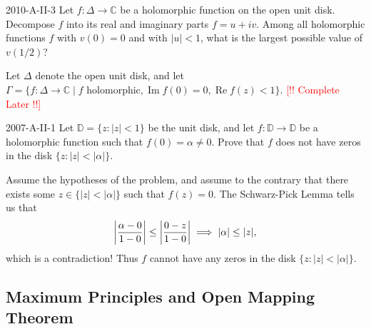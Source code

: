 \documentclass{article}
\newcommand{\complete}{\textcolor{red}{[!! Complete Later !!]}}
\begin{document}
	\begin{prb}{2010-A-II-3}
		Let $f: \Delta \to \mathbb{C}$ be a holomorphic function on the open unit disk. Decompose $f$ into its real and imaginary parts $f = u + iv$. Among all holomorphic functions $f$ with $v(0) = 0$ and with $|u| < 1$, what is the largest possible value of $v(1/2)$? 
	\end{prb}
	Let $\Delta$ denote the open unit disk, and let $\Gamma = \{f: \Delta \to \mathbb{C} \mid f \text{ holomorphic}, \operatorname{Im}{f(0)} = 0, \operatorname{Re}{f(z)} < 1\}$.  \complete 
	
	\begin{prb}{2007-A-II-1}
		Let $\mathbb{D} = \{z: |z| < 1\}$ be the unit disk, and let $f: \mathbb{D} \to \mathbb{D}$ be a holomorphic function such that $f(0) = \alpha \neq 0$. Prove that $f$ does not have zeros in the disk $\{z: |z| < |\alpha|\}$. 
	\end{prb}
	Assume the hypotheses of the problem, and assume to the contrary that there exists some $z \in \{|z| < |\alpha|\}$ such that $f(z) = 0$. The Schwarz-Pick Lemma tells us that 
	\begin{equation*}
		\left| \frac{\alpha - 0}{1 -0} \right| \leq \left| \frac{0 - z}{1 - 0} \right| \implies |\alpha|\leq |z|, 
	\end{equation*}
	which is a contradiction! Thus $f$ cannot have any zeros in the disk $\{z: |z| < |\alpha|\}$. 
	\subsection{Maximum Principles and Open Mapping Theorem}
	
\end{document}
